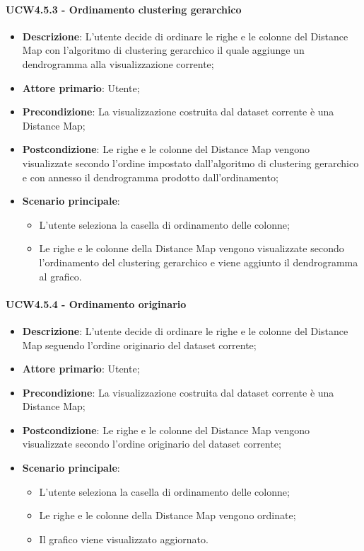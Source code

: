 \paragraph{UCW4.5.3 - Ordinamento clustering gerarchico}
\label{par:ucw4.5.3}
\begin{itemize}
    \item \textbf{Descrizione}: L'utente decide di ordinare le righe e le colonne del Distance Map con l'algoritmo di clustering gerarchico il quale aggiunge un dendrogramma alla visualizzazione corrente;
    \item \textbf{Attore primario}: Utente;
    \item \textbf{Precondizione}: La visualizzazione costruita dal dataset corrente è una Distance Map;
    \item \textbf{Postcondizione}: Le righe e le colonne del Distance Map vengono visualizzate secondo l'ordine impostato dall'algoritmo di clustering gerarchico e con annesso il dendrogramma prodotto dall'ordinamento;
    \item \textbf{Scenario principale}:
    \begin{itemize}
        \item L'utente seleziona la casella di ordinamento delle colonne;
        \item Le righe e le colonne della Distance Map vengono visualizzate secondo l'ordinamento del clustering gerarchico e viene aggiunto il dendrogramma al grafico.
    \end{itemize}
\end{itemize}

\paragraph{UCW4.5.4 - Ordinamento originario}
\label{par:ucw4.5.4}
\begin{itemize}
    \item \textbf{Descrizione}: L'utente decide di ordinare le righe e le colonne del Distance Map seguendo l'ordine originario del dataset corrente;
    \item \textbf{Attore primario}: Utente;
    \item \textbf{Precondizione}: La visualizzazione costruita dal dataset corrente è una Distance Map;
    \item \textbf{Postcondizione}: Le righe e le colonne del Distance Map vengono visualizzate secondo l'ordine originario del dataset corrente;
    \item \textbf{Scenario principale}:
    \begin{itemize}
        \item L'utente seleziona la casella di ordinamento delle colonne;
        \item Le righe e le colonne della Distance Map vengono ordinate;
        \item Il grafico viene visualizzato aggiornato.
    \end{itemize}
\end{itemize}

